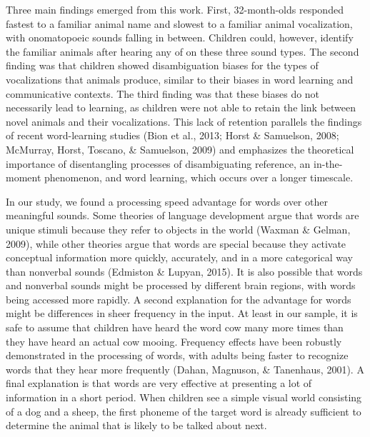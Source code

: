 \documentclass[english,floatsintext,man]{apa6}
\theoremstyle{definition}
\theoremstyle{definition}
\theoremstyle{definition}
\theoremstyle{remark}
\begin{document}
Three main findings emerged from this work. First, 32-month-olds
responded fastest to a familiar animal name and slowest to a familiar
animal vocalization, with onomatopoeic sounds falling in between.
Children could, however, identify the familiar animals after hearing any
of on these three sound types. The second finding was that children
showed disambiguation biases for the types of vocalizations that animals
produce, similar to their biases in word learning and communicative
contexts. The third finding was that these biases do not necessarily
lead to learning, as children were not able to retain the link between
novel animals and their vocalizations. This lack of retention parallels
the findings of recent word-learning studies (Bion et al., 2013; Horst
\& Samuelson, 2008; McMurray, Horst, Toscano, \& Samuelson, 2009) and
emphasizes the theoretical importance of disentangling processes of
disambiguating reference, an in-the-moment phenomenon, and word
learning, which occurs over a longer timescale.

In our study, we found a processing speed advantage for words over other
meaningful sounds. Some theories of language development argue that
words are unique stimuli because they refer to objects in the world
(Waxman \& Gelman, 2009), while other theories argue that words are
special because they activate conceptual information more quickly,
accurately, and in a more categorical way than nonverbal sounds
(Edmiston \& Lupyan, 2015). It is also possible that words and nonverbal
sounds might be processed by different brain regions, with words being
accessed more rapidly. A second explanation for the advantage for words
might be differences in sheer frequency in the input. At least in our
sample, it is safe to assume that children have heard the word cow many
more times than they have heard an actual cow mooing. Frequency effects
have been robustly demonstrated in the processing of words, with adults
being faster to recognize words that they hear more frequently (Dahan,
Magnuson, \& Tanenhaus, 2001). A final explanation is that words are
very effective at presenting a lot of information in a short period.
When children see a simple visual world consisting of a dog and a sheep,
the first phoneme of the target word is already sufficient to determine
the animal that is likely to be talked about next.
\end{document}
